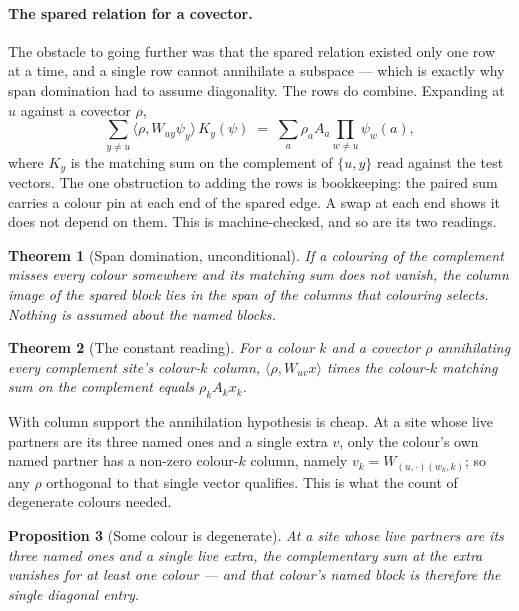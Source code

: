 \documentclass[11pt]{article}
\newtheorem{theorem}{Theorem}[section]
\newtheorem{proposition}[theorem]{Proposition}
\theoremstyle{definition}
\theoremstyle{remark}
\begin{document}
\paragraph{The spared relation for a covector.} The obstacle to going further was that the
spared relation existed only one row at a time, and a single row cannot annihilate a
subspace --- which is exactly why span domination had to assume diagonality. The rows do
combine. Expanding at $u$ against a covector $\rho$,
\[
  \sum_{y \neq u} \langle \rho, W_{uy}\psi_y\rangle\, K_y(\psi)
    \;=\; \sum_a \rho_a A_a \prod_{w \neq u} \psi_w(a),
\]
where $K_y$ is the matching sum on the complement of $\{u,y\}$ read against the test
vectors. The one obstruction to adding the rows is bookkeeping: the paired sum carries a
colour pin at each end of the spared edge. A swap at each end shows it does not depend on
them. This is machine-checked, and so are its two readings.

\begin{theorem}[Span domination, unconditional]\label{thm:spandom}
If a colouring of the complement misses every colour somewhere and its matching sum does not
vanish, the column image of the spared block lies in the span of the columns that colouring
selects. Nothing is assumed about the named blocks.
\end{theorem}

\begin{theorem}[The constant reading]\label{thm:constread}
For a colour $k$ and a covector $\rho$ annihilating every complement site's colour-$k$
column, $\langle \rho, W_{uv}x\rangle$ times the colour-$k$ matching sum on the complement
equals $\rho_k A_k x_k$.
\end{theorem}

With column support the annihilation hypothesis is cheap. At a site whose live partners are
its three named ones and a single extra $v$, only the colour's own named partner has a
non-zero colour-$k$ column, namely $v_k = W_{(u,\cdot)(w_k,k)}$; so any $\rho$ orthogonal to
that single vector qualifies. This is what the count of degenerate colours needed.

\begin{proposition}[Some colour is degenerate]\label{prop:onedegen}
At a site whose live partners are its three named ones and a single live extra, the
complementary sum at the extra vanishes for at least one colour --- and that colour's named
block is therefore the single diagonal entry.
\end{proposition}
\end{document}
